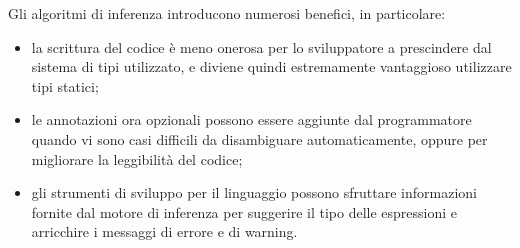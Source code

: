 \noindent Gli algoritmi di inferenza introducono numerosi benefici, in particolare:
\begin{itemize}
      \item la scrittura del codice è meno onerosa per lo sviluppatore a prescindere dal sistema di tipi utilizzato,
            e diviene quindi estremamente vantaggioso utilizzare tipi statici;
      \item le annotazioni ora opzionali possono essere aggiunte dal programmatore quando vi sono casi difficili
            da disambiguare automaticamente, oppure per migliorare la leggibilità del codice;
      \item gli strumenti di sviluppo per il linguaggio possono sfruttare informazioni fornite dal motore di inferenza
            per suggerire il tipo delle espressioni e arricchire i messaggi di errore e di warning.
\end{itemize}

\newpage



